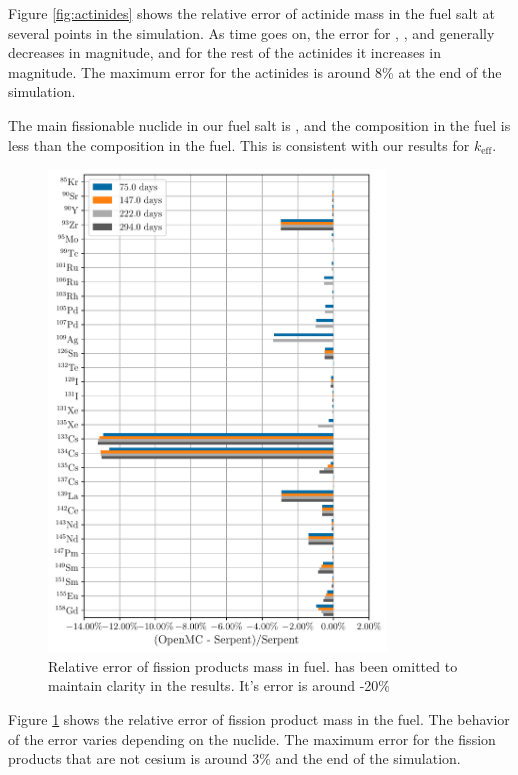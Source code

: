 Figure \ref{fig:actinides} shows the relative error of actinide mass in the fuel
salt at several points in the simulation. As time goes on, the error for
, , and  generally decreases in
magnitude, and for the rest of the actinides it increases in magnitude. The
maximum error for the actinides is around 8\% at the end of the simulation.

The main fissionable nuclide in our fuel salt is , and the
composition in the \OpenMC fuel is less than the composition in the \SerpentTWO
fuel. This is consistent with our results for $k_\text{eff}$.

\begin{figure}[htpb]
    \centering
    \includegraphics[width=0.8\textwidth]{figs/ch5/fission_products.pdf}
    \caption{Relative error of fission products mass in fuel. 
        has been omitted to
        maintain clarity in the results. It's error is around -20\%
    }
    \label{fig:fission-products}
\end{figure}

Figure \ref{fig:fission-products} shows the relative error of fission product
mass in the fuel. The behavior of the error varies depending on the nuclide.
The maximum error for the fission products that are not cesium is around 3\%
and the end of the simulation.

